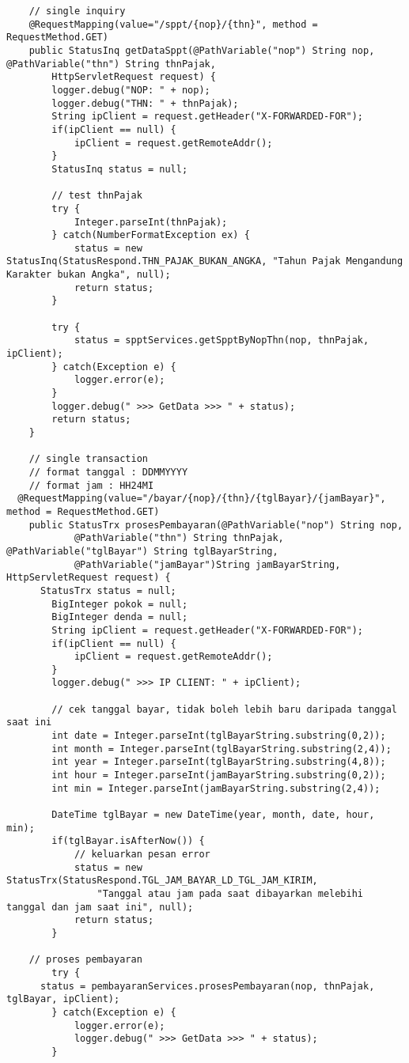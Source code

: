 \documentclass[pdftex,12pt, oneside]{article}
\begin{document}
\begin{lstlisting}
	// single inquiry
	@RequestMapping(value="/sppt/{nop}/{thn}", method = RequestMethod.GET)
	public StatusInq getDataSppt(@PathVariable("nop") String nop, @PathVariable("thn") String thnPajak,
	    HttpServletRequest request) {
		logger.debug("NOP: " + nop);
		logger.debug("THN: " + thnPajak);
		String ipClient = request.getHeader("X-FORWARDED-FOR");
		if(ipClient == null) {
			ipClient = request.getRemoteAddr();
		}
		StatusInq status = null;

		// test thnPajak
		try {
			Integer.parseInt(thnPajak);
		} catch(NumberFormatException ex) {
			status = new StatusInq(StatusRespond.THN_PAJAK_BUKAN_ANGKA, "Tahun Pajak Mengandung Karakter bukan Angka", null);
			return status;
		}

		try {
			status = spptServices.getSpptByNopThn(nop, thnPajak, ipClient);
		} catch(Exception e) {
			logger.error(e);
		}
		logger.debug(" >>> GetData >>> " + status);
		return status;
	}

	// single transaction
	// format tanggal : DDMMYYYY
	// format jam : HH24MI
  @RequestMapping(value="/bayar/{nop}/{thn}/{tglBayar}/{jamBayar}", method = RequestMethod.GET)
	public StatusTrx prosesPembayaran(@PathVariable("nop") String nop,
			@PathVariable("thn") String thnPajak, @PathVariable("tglBayar") String tglBayarString,
			@PathVariable("jamBayar")String jamBayarString, HttpServletRequest request) {
	  StatusTrx status = null;
		BigInteger pokok = null;
		BigInteger denda = null;
		String ipClient = request.getHeader("X-FORWARDED-FOR");
		if(ipClient == null) {
			ipClient = request.getRemoteAddr();
		}
		logger.debug(" >>> IP CLIENT: " + ipClient);

		// cek tanggal bayar, tidak boleh lebih baru daripada tanggal saat ini
		int date = Integer.parseInt(tglBayarString.substring(0,2));
		int month = Integer.parseInt(tglBayarString.substring(2,4));
		int year = Integer.parseInt(tglBayarString.substring(4,8));
		int hour = Integer.parseInt(jamBayarString.substring(0,2));
		int min = Integer.parseInt(jamBayarString.substring(2,4));

		DateTime tglBayar = new DateTime(year, month, date, hour, min);
		if(tglBayar.isAfterNow()) {
			// keluarkan pesan error
			status = new StatusTrx(StatusRespond.TGL_JAM_BAYAR_LD_TGL_JAM_KIRIM,
			    "Tanggal atau jam pada saat dibayarkan melebihi tanggal dan jam saat ini", null);
			return status;
		}

    // proses pembayaran
		try {
      status = pembayaranServices.prosesPembayaran(nop, thnPajak, tglBayar, ipClient);
		} catch(Exception e) {
			logger.error(e);
			logger.debug(" >>> GetData >>> " + status);
		}


\end{lstlisting}
\end{document}
